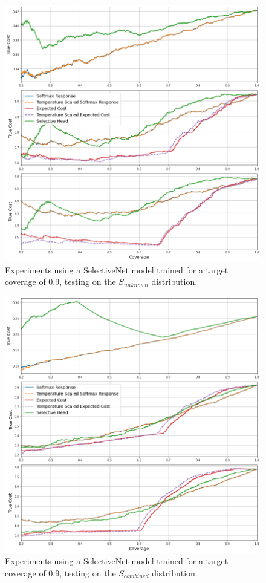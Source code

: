 \begin{figure}[H]
	\includegraphics[width=\textwidth]{images/binary/sn0.9_out_distribution.png}
	\caption*{Experiments using a SelectiveNet model trained for a target coverage of 0.9, testing on the $S_{unknown}$ distribution.}
\end{figure}

\begin{figure}[H]
	\includegraphics[width=\textwidth]{images/binary/sn0.9_combine_distribution.png}
	\caption*{Experiments using a SelectiveNet model trained for a target coverage of 0.9, testing on the $S_{combined}$ distribution.}
\end{figure}

